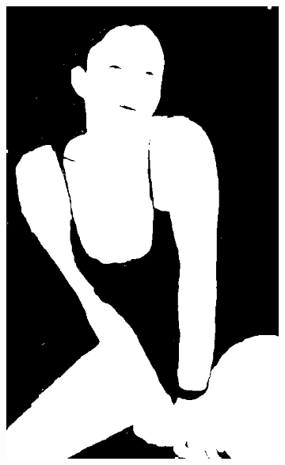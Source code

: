 \begin{figure}[h]
{\begin{subfigure}[b]{0.23\textwidth}
         \includegraphics[width=\textwidth]{images/results/cross/linda_rgb_hgr_sch_y.png}
     \end{subfigure}
    \hfill
     \begin{subfigure}[b]{0.23\textwidth}
         \centering

\end{subfigure}}
\end{figure}
